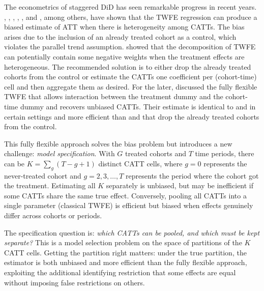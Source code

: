\documentclass[margin=3in, 12pt]{article}
\newcommand{\1}{\mathbbm{1}}
\begin{document}
The econometrics of staggered DiD has seen remarkable progress in recent years. \cite{dechaisemartin2020}, \citet{callaway2021}, \citet{sun2021}, \citet{goodman2021}, \cite{gardner2022two}, and
\citet{borusyak2024}, among others, have shown that the TWFE regression can produce a biased estimate of ATT when there is heterogeneity among CATTs. The bias arises due to the inclusion of an already treated cohort as a control, which violates the parallel trend assumption. \citet{goodman2021} showed that the decomposition of TWFE can potentially contain some negative weights when the treatment effects are heterogeneous. The recommended solution is to either drop the already treated cohorts from the control or estimate the CATTs one coefficient per (cohort-time) cell and then aggregate them as desired. For the later, \cite{wooldridge2025} discussed the fully flexible TWFE that allows interaction between the treatment dummy and the cohort-time dummy and recovers unbiased CATTs. Their estimate is identical to \cite{gardner2022two} and \citet{borusyak2024} in certain settings and more efficient than \cite{callaway2021} and \cite{sun2021} that drop the already treated cohorts from the control.

This fully flexible approach solves the bias problem but introduces a new challenge: \emph{model specification}. With $G$ treated cohorts and $T$ time
periods, there can be $K = \sum_g (T - g + 1)$ distinct CATT cells, where $g = 0$ represents the never-treated cohort and $g=2,3,\dotsc,T$ represents the period where the cohort got the treatment. Estimating all $K$ separately is unbiased, but may be inefficient if some CATTs share the same true effect.
Conversely, pooling all CATTs into a single parameter (classical TWFE) is
efficient but biased when effects genuinely differ across cohorts or periods.

The specification question is: \emph{which CATTs can be pooled, and which
must be kept separate?} This is a model selection problem on the space of
partitions of the $K$ CATT cells. Getting the partition right matters: under
the true partition, the estimator is both unbiased and more efficient than the
fully flexible approach, exploiting the additional identifying restriction that
some effects are equal without imposing false restrictions on others.
\end{document}
